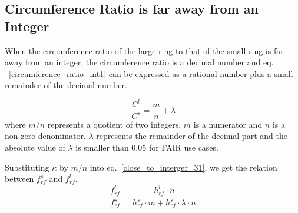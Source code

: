 

%

\subsection{Circumference Ratio is far away from an Integer}
When the circumference ratio of the large ring to that of the small ring is far away from an integer, the circumference ratio is a decimal number and eq. ~\ref{circumference_ratio_int1} can be expressed as a rational number plus a small remainder of the decimal number.

\begin{equation}
\frac{C^l}{C^s}=\frac{m}{n}+ \lambda \label{circumference_ratio_noint11}
\end{equation}
where $m/n$ represents a quotient of two integers, $m$ is a numerator and $n$ is a non-zero denominator. $\lambda$ represents the remainder of the decimal part and the absolute value of $\lambda$ is smaller than $0.05$ for FAIR use cases.   


Substituting $\kappa$ by $m/n$ into eq.~\ref{close_to_interger_31}, we get the relation between $f_{\mathit{rf}}^{s}$ and $f_{\mathit{rf}}^{l}$.
\begin{equation} 
\frac{f_{\mathit{rf}}^{l}}{f_{\mathit{rf}}^{s}}=\frac{h^l_\mathit{rf}\cdot n}{h^s_\mathit{rf} \cdot m+ h^s_\mathit{rf} \cdot\lambda\cdot n}\label{close_to_interger11}
\end{equation}

